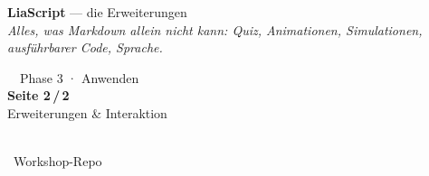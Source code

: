 \documentclass[a4paper,landscape,9pt]{extarticle}
\begin{document}
\newpage

\noindent\begin{tcolorbox}[
  enhanced, frame hidden, sharp corners,
  colback=liagreen, coltext=white,
  left=12pt, right=8pt, top=4pt, bottom=4pt,
  before skip=0pt, after skip=4pt,
  width=\linewidth,
  borderline west={4pt}{-4pt}{liagreen!55}
]
\begin{minipage}[c]{0.66\linewidth}
  {\sffamily\fontsize{26}{28}\selectfont\bfseries LiaScript}\hspace{0.4em}%
  {\sffamily\large\color{white!75} — die Erweiterungen}\\[2pt]
  {\sffamily\footnotesize\itshape\color{white!90} Alles, was Markdown allein nicht kann: Quiz, Animationen, Simulationen, ausführbarer Code, Sprache.}
\end{minipage}\hfill
\begin{minipage}[c]{0.20\linewidth}\raggedright
  {\sffamily\scriptsize\color{white!85}\faGraduationCap~~Phase 3 · Anwenden}\\[2pt]
  {\sffamily\bfseries\normalsize Seite 2\,/\,2}\\[1pt]
  {\sffamily\scriptsize\color{white!75} Erweiterungen \& Interaktion}
\end{minipage}\hfill
\begin{minipage}[c]{0.10\linewidth}\centering
  {\color{black}\colorbox{white}{\hspace{1pt}\hspace{1pt}}}\\[1pt]
  {\sffamily\scriptsize\color{white!90}\faGithub~Workshop-Repo}
\end{minipage}
\end{tcolorbox}

\newcommand{\aufglia}[1]{\hfill{\sffamily\scriptsize\color{white!85}\faTasks~A#1}}
\end{document}
